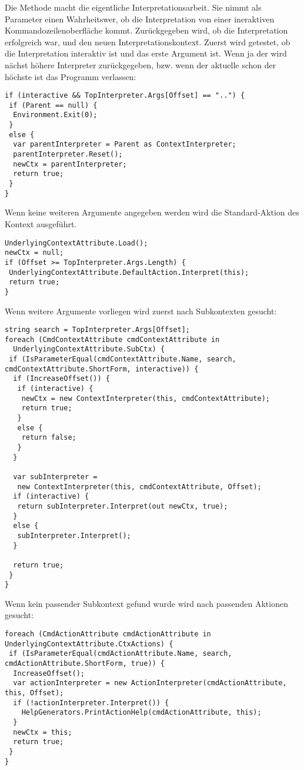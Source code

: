 Die  Methode macht die eigentliche Interpretationsarbeit.
Sie nimmt als Parameter einen Wahrheitswer, ob die Interpretation von einer ineraktiven Kommandozeilenoberfläche kommt.
Zurückgegeben wird, ob die Interpretation erfolgreich war, und den neuen Interpretationskontext.
Zuerst wird getestet, ob die Interpretation interaktiv ist und das erste Argument  ist.
Wenn ja der wird nächst höhere Interpreter zurückgegeben, bzw. wenn der aktuelle schon der höchste ist das Programm verlassen:
\begin{lstlisting}[title=""]
if (interactive && TopInterpreter.Args[Offset] == "..") {
 if (Parent == null) {
  Environment.Exit(0);
 }
 else {
  var parentInterpreter = Parent as ContextInterpreter;
  parentInterpreter.Reset();
  newCtx = parentInterpreter;
  return true;
 }
}
\end{lstlisting}
Wenn keine weiteren Argumente angegeben werden wird die Standard-Aktion des Kontext ausgeführt.
\begin{lstlisting}[title=""]
UnderlyingContextAttribute.Load();
newCtx = null;
if (Offset >= TopInterpreter.Args.Length) {
 UnderlyingContextAttribute.DefaultAction.Interpret(this);
 return true;
}
\end{lstlisting}
Wenn weitere Argumente vorliegen wird zuerst nach Subkontexten gesucht:
\begin{lstlisting}[title=""]
string search = TopInterpreter.Args[Offset];
foreach (CmdContextAttribute cmdContextAttribute in 
  UnderlyingContextAttribute.SubCtx) {
 if (IsParameterEqual(cmdContextAttribute.Name, search, cmdContextAttribute.ShortForm, interactive)) {
  if (IncreaseOffset()) {
   if (interactive) {
    newCtx = new ContextInterpreter(this, cmdContextAttribute);
    return true;
   }
   else {
    return false;
   }
  }

  var subInterpreter = 
   new ContextInterpreter(this, cmdContextAttribute, Offset);
  if (interactive) {
   return subInterpreter.Interpret(out newCtx, true);
  }
  else {
   subInterpreter.Interpret();
  }

  return true;
 }
}
\end{lstlisting}
Wenn kein passender Subkontext gefund wurde wird nach passenden Aktionen gesucht:
\begin{lstlisting}[title=""]
foreach (CmdActionAttribute cmdActionAttribute in UnderlyingContextAttribute.CtxActions) {
 if (IsParameterEqual(cmdActionAttribute.Name, search, cmdActionAttribute.ShortForm, true)) {
  IncreaseOffset();
  var actionInterpreter = new ActionInterpreter(cmdActionAttribute, this, Offset);
  if (!actionInterpreter.Interpret()) {
  	HelpGenerators.PrintActionHelp(cmdActionAttribute, this);
  }
  newCtx = this;
  return true;
 }
}
\end{lstlisting}
